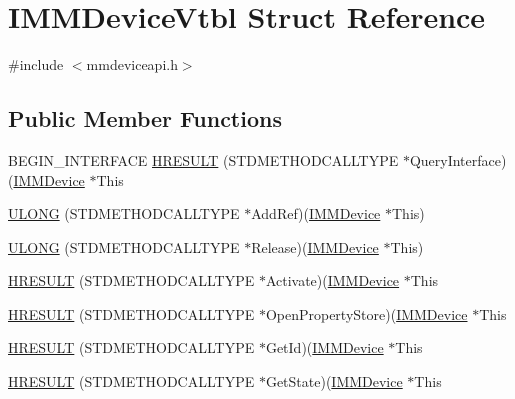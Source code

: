 \hypertarget{struct_i_m_m_device_vtbl}{}\section{I\+M\+M\+Device\+Vtbl Struct Reference}
\label{struct_i_m_m_device_vtbl}


{\ttfamily \#include $<$mmdeviceapi.\+h$>$}

\subsection*{Public Member Functions}
\begin{DoxyCompactItemize}
\item 
B\+E\+G\+I\+N\+\_\+\+I\+N\+T\+E\+R\+F\+A\+CE \hyperlink{struct_i_m_m_device_vtbl_a002549cedb45d5489cbddf7ca3bebfa2}{H\+R\+E\+S\+U\+LT} (S\+T\+D\+M\+E\+T\+H\+O\+D\+C\+A\+L\+L\+T\+Y\+PE $\ast$Query\+Interface)(\hyperlink{mmdeviceapi_8h_a8d4cacf41e022eb8b6aed6231bcf54be}{I\+M\+M\+Device} $\ast$This
\item 
\hyperlink{struct_i_m_m_device_vtbl_aa322c211bea787e1796fa3e49a5df977}{U\+L\+O\+NG} (S\+T\+D\+M\+E\+T\+H\+O\+D\+C\+A\+L\+L\+T\+Y\+PE $\ast$Add\+Ref)(\hyperlink{mmdeviceapi_8h_a8d4cacf41e022eb8b6aed6231bcf54be}{I\+M\+M\+Device} $\ast$This)
\item 
\hyperlink{struct_i_m_m_device_vtbl_a4e52994f23e4f2ea410383d89cb059df}{U\+L\+O\+NG} (S\+T\+D\+M\+E\+T\+H\+O\+D\+C\+A\+L\+L\+T\+Y\+PE $\ast$Release)(\hyperlink{mmdeviceapi_8h_a8d4cacf41e022eb8b6aed6231bcf54be}{I\+M\+M\+Device} $\ast$This)
\item 
\hyperlink{struct_i_m_m_device_vtbl_a43ac73c929f188368c4b1ac2cdfcdfa7}{H\+R\+E\+S\+U\+LT} (S\+T\+D\+M\+E\+T\+H\+O\+D\+C\+A\+L\+L\+T\+Y\+PE $\ast$Activate)(\hyperlink{mmdeviceapi_8h_a8d4cacf41e022eb8b6aed6231bcf54be}{I\+M\+M\+Device} $\ast$This
\item 
\hyperlink{struct_i_m_m_device_vtbl_a500aeacb5ee32aa072a02a2286d2a891}{H\+R\+E\+S\+U\+LT} (S\+T\+D\+M\+E\+T\+H\+O\+D\+C\+A\+L\+L\+T\+Y\+PE $\ast$Open\+Property\+Store)(\hyperlink{mmdeviceapi_8h_a8d4cacf41e022eb8b6aed6231bcf54be}{I\+M\+M\+Device} $\ast$This
\item 
\hyperlink{struct_i_m_m_device_vtbl_ad2c487377c58940e0fa466ef3074bba0}{H\+R\+E\+S\+U\+LT} (S\+T\+D\+M\+E\+T\+H\+O\+D\+C\+A\+L\+L\+T\+Y\+PE $\ast$Get\+Id)(\hyperlink{mmdeviceapi_8h_a8d4cacf41e022eb8b6aed6231bcf54be}{I\+M\+M\+Device} $\ast$This
\item 
\hyperlink{struct_i_m_m_device_vtbl_aa0d0325c32a702c01f01cac3fb68b636}{H\+R\+E\+S\+U\+LT} (S\+T\+D\+M\+E\+T\+H\+O\+D\+C\+A\+L\+L\+T\+Y\+PE $\ast$Get\+State)(\hyperlink{mmdeviceapi_8h_a8d4cacf41e022eb8b6aed6231bcf54be}{I\+M\+M\+Device} $\ast$This
\end{DoxyCompactItemize}

